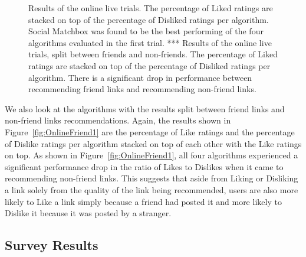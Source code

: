 \begin{figure}[t!]
\caption{Results of the online live trials. The percentage of Liked
ratings are stacked on top of the percentage of Disliked ratings per
algorithm. Social Matchbox was found to be the best performing of the
four algorithms evaluated in the first trial.  *** Results of the online
live trials, split between friends and non-friends. The percentage of
Liked ratings are stacked on top of the percentage of Disliked ratings
per algorithm. There is a significant drop in performance between
recommending friend links and recommending non-friend links.}
\label{fig:OnlineResult1}
\end{figure}

We also look at the algorithms with the results split between friend
links and non-friend links recommendations. Again, the results shown
in Figure~\ref{fig:OnlineFriend1} are the percentage of Like ratings
and the percentage of Dislike ratings per algorithm stacked on top of
each other with the Like ratings on top. As shown in
Figure~\ref{fig:OnlineFriend1}, all four algorithms experienced a
significant performance drop in the ratio of Likes to Dislikes when it
came to recommending non-friend links. This suggests that aside from
Liking or Disliking a link solely from the quality of the link being
recommended, users are also more likely to Like a link simply because
a friend had posted it and more likely to Dislike it because it was
posted by a stranger.

\subsection{Survey Results}

